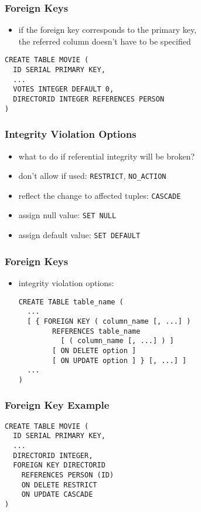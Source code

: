 \documentclass[dvipsnames]{beamer}
\theoremstyle{plain}
\begin{document}
\begin{frame}[fragile]
  \frametitle{Foreign Keys}

  \begin{itemize}
    \item if the foreign key corresponds to the primary key,\\
      the referred column doesn't have to be specified
  \end{itemize}

  \begin{example}
    \begin{lstlisting}
CREATE TABLE MOVIE (
  ID SERIAL PRIMARY KEY,
  ...
  VOTES INTEGER DEFAULT 0,
  DIRECTORID INTEGER REFERENCES PERSON
)
    \end{lstlisting}
  \end{example}
\end{frame}

\begin{frame}
  \frametitle{Integrity Violation Options}

  \begin{itemize}
    \item what to do if referential integrity will be broken?

    \medskip
    \item don't allow if used: \texttt{RESTRICT}, \texttt{NO\_ACTION}
    \item reflect the change to affected tuples: \texttt{CASCADE}
    \item assign null value: \texttt{SET NULL}
    \item assign default value: \texttt{SET DEFAULT}
  \end{itemize}
\end{frame}

\begin{frame}[fragile]
  \frametitle{Foreign Keys}

  \begin{itemize}
    \item integrity violation options:
    \begin{lstlisting}
CREATE TABLE table_name (
  ...
  [ { FOREIGN KEY ( column_name [, ...] )
        REFERENCES table_name
          [ ( column_name [, ...] ) ]
        [ ON DELETE option ]
        [ ON UPDATE option ] } [, ...] ]
  ...
)
    \end{lstlisting}
  \end{itemize}
\end{frame}

\begin{frame}[fragile]
  \frametitle{Foreign Key Example}

  \begin{lstlisting}
CREATE TABLE MOVIE (
  ID SERIAL PRIMARY KEY,
  ...
  DIRECTORID INTEGER,
  FOREIGN KEY DIRECTORID
    REFERENCES PERSON (ID)
    ON DELETE RESTRICT
    ON UPDATE CASCADE
)
  \end{lstlisting}
\end{frame}
\end{document}

